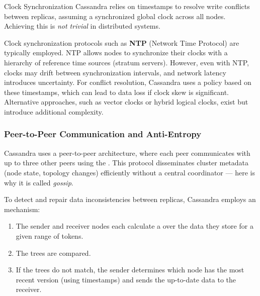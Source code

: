 \begin{warning}{Clock Synchronization}
    Cassandra relies on timestamps to resolve write conflicts between replicas, assuming a synchronized global clock across all nodes. Achieving this is \emph{not trivial} in distributed systems.

    Clock synchronization protocols such as \textbf{NTP} (Network Time Protocol) are typically employed. NTP allows nodes to synchronize their clocks with a hierarchy of reference time sources (stratum servers). However, even with NTP, clocks may drift between synchronization intervals, and network latency introduces uncertainty. For conflict resolution, Cassandra uses a  policy based on these timestamps, which can lead to data loss if clock skew is significant. Alternative approaches, such as vector clocks or hybrid logical clocks, exist but introduce additional complexity.
\end{warning}

\subsubsection{Peer-to-Peer Communication and Anti-Entropy}

Cassandra uses a peer-to-peer architecture, where each peer communicates with up to three other peers using the . This protocol disseminates cluster metadata (node state, topology changes) efficiently without a central coordinator --- here is why it is called \emph{gossip}.

To detect and repair data inconsistencies between replicas, Cassandra employs an  mechanism:
\begin{enumerate}
    \item The sender and receiver nodes each calculate a  over the data they store for a given range of tokens.
    \item The trees are compared. 
    \item If the trees do not match, the sender determines which node has the most recent version (using timestamps) and sends the up-to-date data to the receiver.
\end{enumerate}

